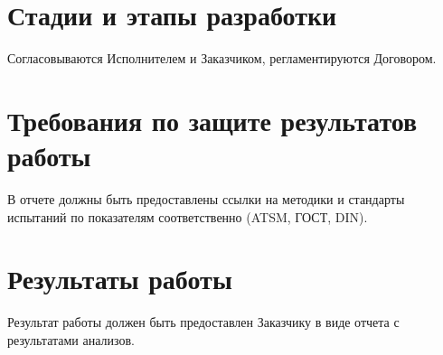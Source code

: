 \documentclass[russian,utf8]{eskdtext}
\begin{document}
   \section{Стадии и этапы разработки}
   Согласовываются Исполнителем и Заказчиком, регламентируются Договором.
   \section{Требования по защите результатов работы}
   В отчете должны быть предоставлены ссылки на методики и стандарты испытаний по показателям соответственно (ATSM, ГОСТ, DIN). 
   \section{Результаты работы}
   Результат работы должен быть предоставлен Заказчику в виде отчета с результатами анализов.
   
\end{document}
